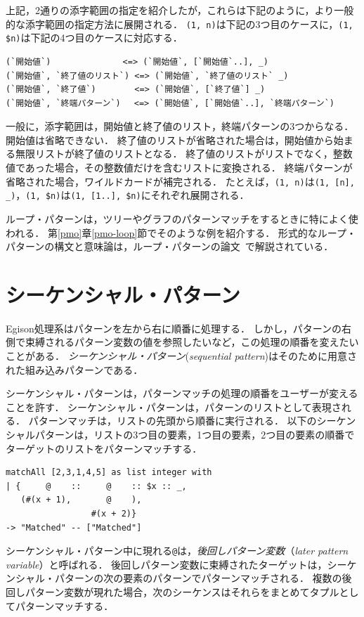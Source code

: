 上記，2通りの添字範囲の指定を紹介したが，これらは下記のように，より一般的な添字範囲の指定方法に展開される．
\lstinline{(1, n)}は下記の3つ目のケースに，\lstinline{(1, $n)}は下記の4つ目のケースに対応する．
\begin{lstlisting}[language=egison,numbers=none]
(`開始値`)　　　　　　　　 <=> (`開始値`, [`開始値`..], _)
(`開始値`, `終了値のリスト`) <=> (`開始値`, `終了値のリスト` _)
(`開始値`, `終了値`)　　　　 <=> (`開始値`, [`終了値`] _)
(`開始値`, `終端パターン`)　 <=> (`開始値`, [`開始値`..], `終端パターン`)
\end{lstlisting}
一般に，添字範囲は，開始値と終了値のリスト，終端パターンの3つからなる．
開始値は省略できない．
終了値のリストが省略された場合は，開始値から始まる無限リストが終了値のリストとなる．
終了値のリストがリストでなく，整数値であった場合，その整数値だけを含むリストに変換される．
終端パターンが省略された場合，ワイルドカードが補完される．
たとえば，\lstinline{(1, n)}は\lstinline{(1, [n], _)}，\lstinline{(1, $n)}は\lstinline{(1, [1..], $n)}にそれぞれ展開される．

ループ・パターンは，ツリーやグラフのパターンマッチをするときに特によく使われる．
第\ref{pmo}章\ref{pmo-loop}節でそのような例を紹介する．
形式的なループ・パターンの構文と意味論は，ループ・パターンの論文~\cite{egi2018loop}で解説されている．

\section{シーケンシャル・パターン}\label{quick-seq-pat}

Egison処理系はパターンを左から右に順番に処理する．
しかし，パターンの右側で束縛されるパターン変数の値を参照したいなど，この処理の順番を変えたいことがある．
\emph{シーケンシャル・パターン}(\emph{sequential pattern})はそのために用意された組み込みパターンである．

シーケンシャル・パターンは，パターンマッチの処理の順番をユーザーが変えることを許す．
シーケンシャル・パターンは，パターンのリストとして表現される．
パターンマッチは，リストの先頭から順番に実行される．
以下のシーケンシャルパターンは，リストの3つ目の要素，1つ目の要素，2つ目の要素の順番でターゲットのリストをパターンマッチする．
\begin{lstlisting}[language=egison,numbers=none]
matchAll [2,3,1,4,5] as list integer with
| {     @    ::     @    :: $x :: _,
   (#(x + 1),       @    ),
                 #(x + 2)}
-> "Matched" -- ["Matched"]
\end{lstlisting}
シーケンシャル・パターン中に現れる\lstinline|@|は，\emph{後回しパターン変数}（\emph{later pattern variable}）と呼ばれる．
後回しパターン変数に束縛されたターゲットは，シーケンシャル・パターンの次の要素のパターンでパターンマッチされる．
複数の後回しパターン変数が現れた場合，次のシーケンスはそれらをまとめてタプルとしてパターンマッチする．

